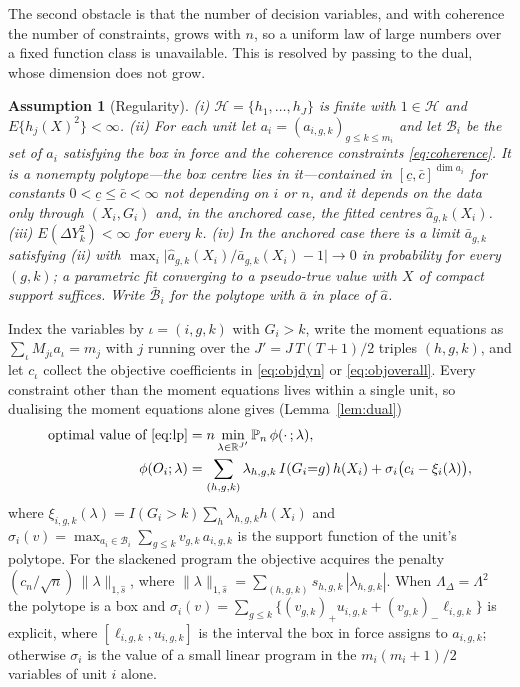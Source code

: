 \documentclass[12pt]{article}
\newtheorem{assumption}{Assumption}
\theoremstyle{remark}
\begin{document}
The second obstacle is that the number of decision variables, and with coherence the
number of constraints, grows with $n$, so a uniform law of large numbers over a fixed
function class is unavailable. This is resolved by passing to the dual, whose dimension
does not grow.

\begin{assumption}[Regularity]
\label{ass:reg}
(i) $\mathcal{H} = \{h_1, \ldots, h_J\}$ is finite with $1 \in \mathcal{H}$ and
$E\{h_j(X)^2\} < \infty$.
(ii) For each unit let $a_i = (a_{i,g,k})_{g \le k \le m_i}$ and let $\mathcal{B}_i$ be
the set of $a_i$ satisfying the box in force and the coherence constraints
\eqref{eq:coherence}. It is a nonempty polytope---the box centre lies in it---contained in
$[\underline{c}, \bar{c}]^{\dim a_i}$ for constants $0 < \underline{c} \le \bar{c} < \infty$
not depending on $i$ or $n$, and it depends on the data only through $(X_i, G_i)$ and, in
the anchored case, the fitted centres $\widehat a_{g,k}(X_i)$.
(iii) $E(\Delta Y_k^2) < \infty$ for every $k$.
(iv) In the anchored case there is a limit $\bar a_{g,k}$ satisfying (ii) with
$\max_i \big|\widehat a_{g,k}(X_i)/\bar a_{g,k}(X_i) - 1\big| \to 0$ in probability for
every $(g,k)$; a parametric fit converging to a pseudo-true value with $X$ of compact
support suffices. Write $\bar{\mathcal{B}}_i$ for the polytope with $\bar a$ in place of
$\widehat a$.
\end{assumption}

Index the variables by $\iota = (i,g,k)$ with $G_i > k$, write the moment equations as
$\sum_\iota M_{j\iota} a_\iota = m_j$ with $j$ running over the $J' = J\,T(T{+}1)/2$
triples $(h,g,k)$, and let $c_\iota$ collect the objective coefficients in
\eqref{eq:objdyn} or \eqref{eq:objoverall}. Every constraint other than the moment
equations lives within a single unit, so dualising the moment equations alone gives
(Lemma~\ref{lem:dual})
\begin{align}
\text{optimal value of \eqref{eq:lp}}
 &= n \min_{\lambda \in \mathbb{R}^{J'}} \mathbb{P}_n\, \phi(\cdot\,;\lambda),
\label{eq:dualphi}\\
\phi(O_i;\lambda) &= \sum_{(h,g,k)} \lambda_{h,g,k}\, I(G_i{=}g)\, h(X_i)
 + \sigma_i\big(c_i - \xi_i(\lambda)\big),
\nonumber
\end{align}
where $\xi_{i,g,k}(\lambda) = I(G_i{>}k)\sum_{h} \lambda_{h,g,k} h(X_i)$ and
$\sigma_i(v) = \max_{a_i \in \mathcal{B}_i} \sum_{g \le k} v_{g,k}\, a_{i,g,k}$ is the
support function of the unit's polytope. For the slackened program the objective acquires
the penalty $(c_n/\sqrt{n})\,\|\lambda\|_{1,\widehat s}$, where
$\|\lambda\|_{1,\widehat s} = \sum_{(h,g,k)} \widehat s_{h,g,k}\,|\lambda_{h,g,k}|$. When $\Lambda_\Delta = \Lambda^2$ the
polytope is a box and $\sigma_i(v) = \sum_{g \le k}\{(v_{g,k})_+ u_{i,g,k} +
(v_{g,k})_- \ell_{i,g,k}\}$ is explicit, where $[\ell_{i,g,k}, u_{i,g,k}]$ is the
interval the box in force assigns to $a_{i,g,k}$; otherwise $\sigma_i$ is the value of a small
linear program in the $m_i(m_i{+}1)/2$ variables of unit $i$ alone.
\end{document}
